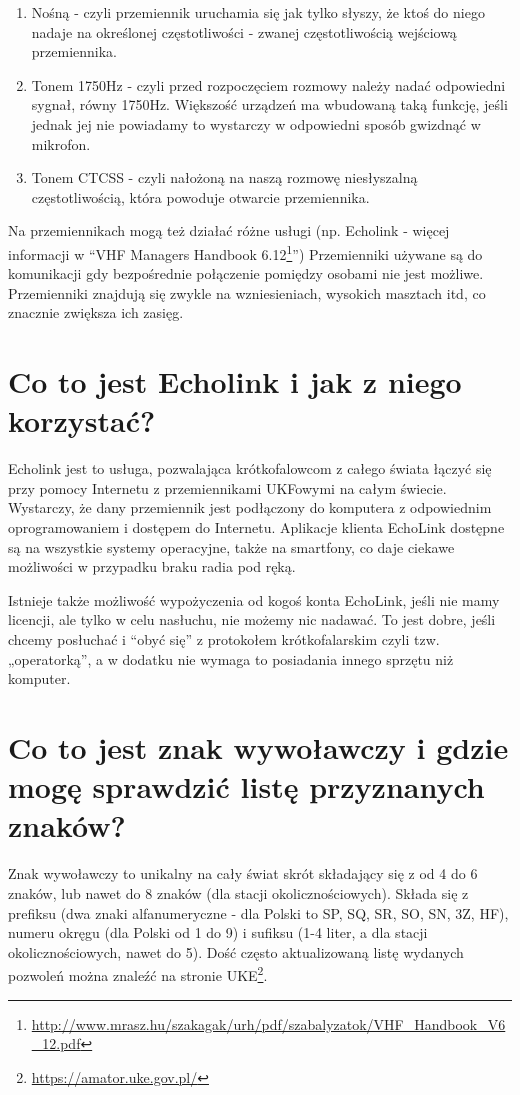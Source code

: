 \documentclass[a4paper,12pt]{article}
\begin{document}
\begin{enumerate}
 \item Nośną - czyli przemiennik uruchamia się jak tylko słyszy, że ktoś do niego nadaje na określonej częstotliwości - zwanej częstotliwością wejściową przemiennika.
 \item Tonem 1750Hz - czyli przed rozpoczęciem rozmowy należy nadać odpowiedni sygnał, równy 1750Hz. Większość urządzeń ma wbudowaną taką funkcję, jeśli jednak jej nie powiadamy to wystarczy w odpowiedni sposób gwizdnąć w mikrofon.
 \item Tonem CTCSS - czyli nałożoną na naszą rozmowę niesłyszalną częstotliwością, która powoduje otwarcie przemiennika.
\end{enumerate}


Na przemiennikach mogą też działać różne usługi (np. Echolink - więcej informacji w “VHF Managers Handbook 6.12\footnote{\url{http://www.mrasz.hu/szakagak/urh/pdf/szabalyzatok/VHF\_Handbook\_V6\_12.pdf}}”)  Przemienniki używane są do komunikacji gdy bezpośrednie połączenie pomiędzy osobami nie jest możliwe. Przemienniki znajdują się zwykle na wzniesieniach, wysokich masztach itd, co znacznie zwiększa ich zasięg.

\section{Co to jest Echolink i jak z niego korzystać?}
Echolink jest to usługa, pozwalająca krótkofalowcom z całego świata łączyć się przy pomocy Internetu z przemiennikami UKFowymi na całym świecie. Wystarczy, że dany przemiennik jest podłączony do komputera z odpowiednim oprogramowaniem i dostępem do Internetu.
Aplikacje klienta EchoLink dostępne są na wszystkie systemy operacyjne, także na smartfony, co daje ciekawe możliwości w przypadku braku radia pod ręką.

Istnieje także możliwość wypożyczenia od kogoś konta EchoLink, jeśli nie mamy licencji, ale tylko w celu nasłuchu, nie możemy nic nadawać. To jest dobre, jeśli chcemy posłuchać i “obyć się” z protokołem krótkofalarskim czyli tzw. „operatorką”, a w dodatku nie wymaga to posiadania innego sprzętu niż komputer.

\section{Co to jest znak wywoławczy i gdzie mogę sprawdzić listę przyznanych znaków?}
Znak wywoławczy to unikalny na cały świat skrót składający się z od 4 do 6 znaków, lub nawet do 8 znaków (dla stacji okolicznościowych). Składa się z prefiksu (dwa znaki alfanumeryczne - dla Polski to SP, SQ, SR, SO, SN, 3Z, HF), numeru okręgu (dla Polski od 1 do 9) i sufiksu (1-4 liter, a dla stacji okolicznościowych, nawet do 5).
Dość często aktualizowaną listę wydanych pozwoleń można znaleźć na stronie UKE\footnote{\url{https://amator.uke.gov.pl/}}.
\end{document}
